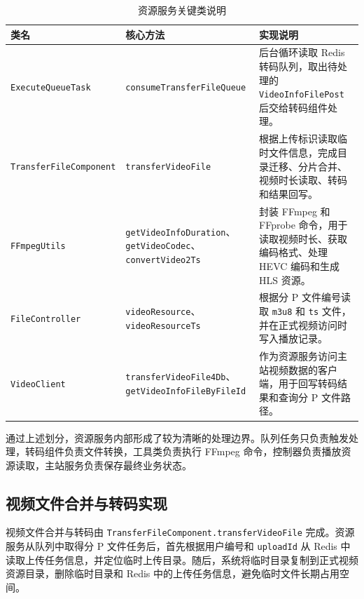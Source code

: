 \begin{table}[!htbp]
    \centering
    \caption{资源服务关键类说明}
    \label{tab:resource-service-core-class}
    \begin{tabular}{p{} p{} p{}}
        \toprule
        \textbf{类名} & \textbf{核心方法} & \textbf{实现说明} \\
        \midrule
        \texttt{ExecuteQueueTask}
        & \texttt{consumeTransferFileQueue}
        & 后台循环读取 Redis 转码队列，取出待处理的 \texttt{VideoInfoFilePost} 后交给转码组件处理。 \\

        \texttt{TransferFileComponent}
        & \texttt{transferVideoFile}
        & 根据上传标识读取临时文件信息，完成目录迁移、分片合并、视频时长读取、转码和结果回写。 \\

        \texttt{FFmpegUtils}
        & \texttt{getVideoInfoDuration}、\texttt{getVideoCodec}、\texttt{convertVideo2Ts}
        & 封装 FFmpeg 和 FFprobe 命令，用于读取视频时长、获取编码格式、处理 HEVC 编码和生成 HLS 资源。 \\

        \texttt{FileController}
        & \texttt{videoResource}、\texttt{videoResourceTs}
        & 根据分 P 文件编号读取 \texttt{m3u8} 和 \texttt{ts} 文件，并在正式视频访问时写入播放记录。 \\

        \texttt{VideoClient}
        & \texttt{transferVideoFile4Db}、\texttt{getVideoInfoFileByFileId}
        & 作为资源服务访问主站视频数据的客户端，用于回写转码结果和查询分 P 文件路径。 \\
        \bottomrule
    \end{tabular}
\end{table}

通过上述划分，资源服务内部形成了较为清晰的处理边界。队列任务只负责触发处理，转码组件负责文件转换，工具类负责执行 FFmpeg 命令，控制器负责播放资源读取，主站服务负责保存最终业务状态。

\subsection{视频文件合并与转码实现}

视频文件合并与转码由 \texttt{TransferFileComponent.transferVideoFile} 完成。资源服务从队列中取得分 P 文件任务后，首先根据用户编号和 \texttt{uploadId} 从 Redis 中读取上传任务信息，并定位临时上传目录。随后，系统将临时目录复制到正式视频资源目录，删除临时目录和 Redis 中的上传任务信息，避免临时文件长期占用空间。

